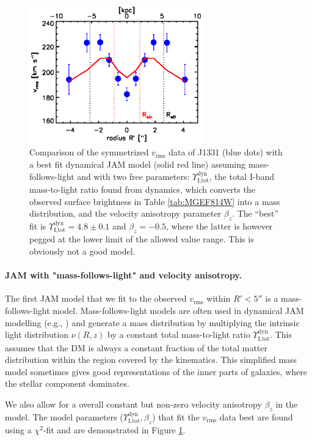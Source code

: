 \begin{figure}
  \centering
  \includegraphics[height=6cm]{fig/jam_A2_vrms.ps}
  \caption{Comparison of the symmetrized $v_\text{rms}$ data of J1331 (blue dots) with a best fit dynamical JAM model (solid red line) assuming mass-follows-light and with two free parameters: $\Upsilon_\text{I,tot}^\text{dyn}$, the total I-band mass-to-light ratio found from dynamics, which converts the observed surface brightness in Table \ref{tab:MGEF814W} into a mass distribution, and the velocity anisotropy parameter $\beta_z$. The ``best'' fit is $\Upsilon_\text{I,tot}^\text{dyn} = 4.8 \pm 0.1$ and $\beta_z = -0.5$, where the latter is however pegged at the lower limit of the allowed value range. This is obviously not a good model. }
  \label{fig:JAM_modelA2}
\end{figure}



\paragraph{JAM with "mass-follows-light" and velocity anisotropy.} The first JAM model that we fit to the observed $v_\text{rms}$ within $R'<5''$ is a mass-follows-light model. Mass-follows-light models are often used in dynamical JAM modelling (e.g., \citealt{GlennEC,Cap06}) and generate a mass distribution by multiplying the intrinsic light distribution $\nu(R,z)$ by a constant total mass-to-light ratio  $\Upsilon_\text{I,tot}^\text{dyn}$. This assumes that the DM is always a constant fraction of the total matter distribution within the region covered by the kinematics. This simplified mass model sometimes gives good representations of the inner parts of galaxies, where the stellar component dominates.

We also allow for a overall constant but non-zero velocity anisotropy $\beta_z$ in the model. The model parameters ($\Upsilon_\text{I,tot}^\text{dyn},\beta_z$) that fit the $v_\text{rms}$ data best are found using a $\chi^2$-fit and are demonstrated in Figure \ref{fig:JAM_modelA2}. 

